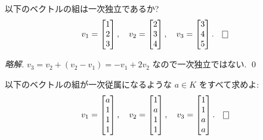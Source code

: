 \documentclass[12pt,twoside]{jarticle}
\newcommand\commentout[1]{#1}
\newcommand\commentout[1]{}
\begin{document}

\begin{question}
  \label{q:lin-indep-1}
  以下のベクトルの組は一次独立であるか?
  \begin{equation*}
    v_1 = \begin{bmatrix}
      1 \\ 2 \\ 3 \\
    \end{bmatrix},
    \quad
    v_2 = \begin{bmatrix}
      2 \\ 3 \\ 4 \\
    \end{bmatrix},
    \quad
    v_3 = \begin{bmatrix}
      3 \\ 4 \\ 5 \\
    \end{bmatrix}.
    \qed
  \end{equation*}
\end{question}

\commentout{
\begin{proof}[略解]
  $v_3 = v_2 + (v_2-v_1) = -v_1 + 2v_2$ なので一次独立ではない.
  \qed
\end{proof}
}

\begin{question}
  \label{q:lin-indep-2}
  以下のベクトルの組が一次従属になるような $a\in K$ をすべて求めよ:
  \begin{equation*}
    v_1 = \begin{bmatrix}
      a \\ 1 \\ 1 \\ 1 \\
    \end{bmatrix},
    \quad
    v_2 = \begin{bmatrix}
      1 \\ a \\ 1 \\ 1 \\
    \end{bmatrix},
    \quad
    v_3 = \begin{bmatrix}
      1 \\ 1 \\ a \\ a \\
    \end{bmatrix}.
    \qed
  \end{equation*}
\end{question}
\end{document}
